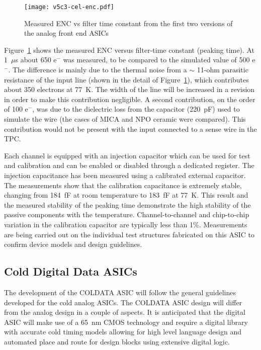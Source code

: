 \begin{figure}[htbp]
\centering
\texttt{[image: v5c3-cel-enc.pdf]}
\caption[Measured ENC vs filter time constant]{Measured ENC vs filter time constant from the first two versions of the analog front end ASICs}
\label{fig:ce_elec_enc}
\end{figure}

Figure~\ref{fig:ce_elec_enc} shows the measured ENC versus filter-time constant (peaking time).
At 1~$\mu$s about 650 e$^{-}$ was measured,
to be compared to the simulated value of 500 e$^{-}$. The difference is
mainly due to the thermal noise from a $\sim$
11-ohm parasitic resistance of the input
line (shown in the detail of Figure~\ref{fig:ce_elec_enc}), which contributes about 350
electrons at 77~K. The width of the line will be increased in a
revision in order to make this contribution negligible. A second
contribution, on the order of 100 e$^{-}$, was due to the dielectric
loss from the  capacitor (220~pF) used to simulate the wire (the cases of MICA and NPO ceramic were compared). This contribution would not be
present with the input connected to a sense wire in the TPC.

Each channel is equipped with an injection capacitor which can be used
for test and calibration and can be enabled or disabled through a
dedicated register. The injection capacitance has been measured using 
a calibrated external capacitor. The measurements show
that the calibration capacitance is extremely stable, changing from
184~fF at room temperature to 183~fF at 77~K. This result and the measured
stability of the peaking time demonstrate the high stability of the
passive components with the temperature. Channel-to-channel and chip-to-chip
variation in the calibration capacitor are typically less than 1\%. Measurements are being carried
out on the individual test structures fabricated on this ASIC to
confirm device models and design guidelines.

%
\subsection{Cold Digital Data ASICs}
\label{subsec:fe_CMOS_digital}

The development of the COLDATA ASIC will follow the general guidelines developed for the cold analog ASICs.
The COLDATA ASIC design will differ from the analog design in a couple of aspects.
It is anticipated that the digital ASIC will make use of a 65~nm CMOS technology and require a
digital library with accurate cold timing models allowing for high level language design and
automated place and route for design blocks using extensive digital logic.  

